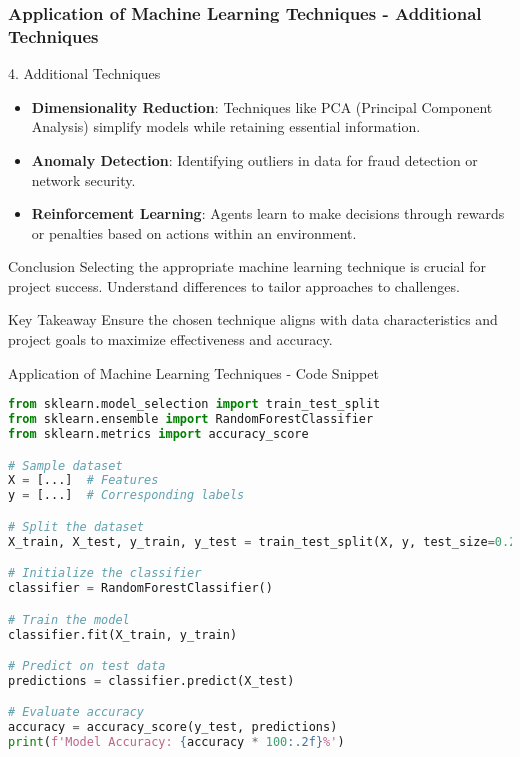 \documentclass[aspectratio=169]{beamer}
\begin{document}
\begin{frame}[fragile]
    \frametitle{Application of Machine Learning Techniques - Additional Techniques}
    \begin{block}{4. Additional Techniques}
        \begin{itemize}
            \item \textbf{Dimensionality Reduction}: Techniques like PCA (Principal Component Analysis) simplify models while retaining essential information.
            \item \textbf{Anomaly Detection}: Identifying outliers in data for fraud detection or network security.
            \item \textbf{Reinforcement Learning}: Agents learn to make decisions through rewards or penalties based on actions within an environment.
        \end{itemize}
    \end{block}

    \begin{block}{Conclusion}
        Selecting the appropriate machine learning technique is crucial for project success. Understand differences to tailor approaches to challenges.
    \end{block}
    
    \begin{block}{Key Takeaway}
        Ensure the chosen technique aligns with data characteristics and project goals to maximize effectiveness and accuracy.
    \end{block}
\end{frame}

\begin{frame}[fragile]{Application of Machine Learning Techniques - Code Snippet}
    \begin{lstlisting}[language=Python]
from sklearn.model_selection import train_test_split
from sklearn.ensemble import RandomForestClassifier
from sklearn.metrics import accuracy_score

# Sample dataset
X = [...]  # Features
y = [...]  # Corresponding labels

# Split the dataset
X_train, X_test, y_train, y_test = train_test_split(X, y, test_size=0.2)

# Initialize the classifier
classifier = RandomForestClassifier()

# Train the model
classifier.fit(X_train, y_train)

# Predict on test data
predictions = classifier.predict(X_test)

# Evaluate accuracy
accuracy = accuracy_score(y_test, predictions)
print(f'Model Accuracy: {accuracy * 100:.2f}%')
    \end{lstlisting}
\end{frame}
\end{document}
